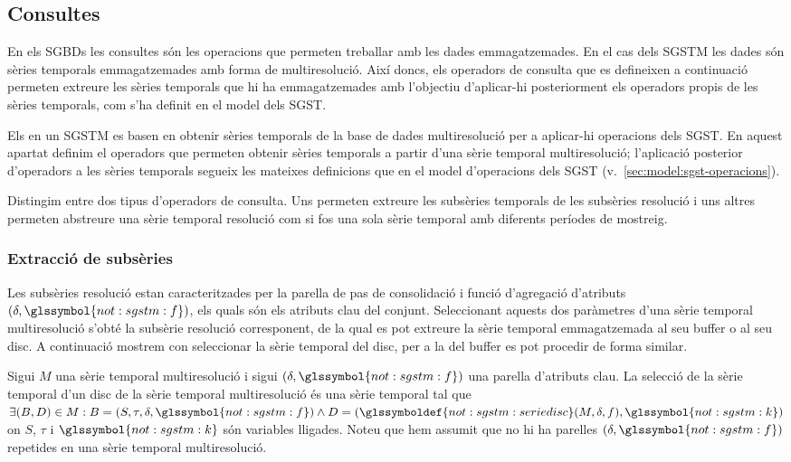 \subsection{Consultes}
\label{sec:sgstm:consultes}

En els \glspl{SGBD} les consultes són les
operacions que permeten treballar amb les dades emmagatzemades. En el
cas dels \gls{SGSTM} les dades són sèries temporals emmagatzemades amb forma
de multiresolució. Així doncs, els operadors de consulta que es
defineixen a continuació permeten extreure les sèries temporals que hi
ha emmagatzemades amb l'objectiu d’aplicar-hi posteriorment els
operadors propis de les sèries temporals, com s'ha definit en el model
dels \gls{SGST}.

Els  en un
\gls{SGSTM} es basen en obtenir sèries temporals de la base de dades
multiresolució per a aplicar-hi operacions dels \gls{SGST}.  En
aquest apartat definim el operadors que permeten obtenir sèries
temporals a partir d'una sèrie temporal multiresolució; l'aplicació
posterior d'operadors a les sèries temporals segueix les mateixes
definicions que en el model d'operacions dels \gls{SGST}
(v.~\autoref{sec:model:sgst-operacions}).

Distingim entre dos tipus d'operadors de consulta. Uns permeten
extreure les subsèries temporals de les subsèries resolució i uns altres
permeten abstreure una sèrie temporal resolució com si fos una sola
sèrie temporal amb diferents períodes de mostreig.


\subsubsection{Extracció de subsèries}


Les subsèries resolució estan caracteritzades per la parella de pas de
consolidació i funció d'agregació d'atributs
$(\delta,\glssymbol{not:sgstm:f})$, els quals són els atributs clau del
conjunt. Seleccionant aquests dos paràmetres d'una sèrie temporal
multiresolució s'obté la subsèrie resolució corresponent, de la qual
es pot extreure la sèrie temporal emmagatzemada al seu buffer o al seu
disc. A continuació mostrem con seleccionar la sèrie temporal del
disc, per a la del buffer es pot procedir de forma similar.

\begin{definition}
  Sigui $M$ una sèrie temporal multiresolució i sigui
  $(\delta,\glssymbol{not:sgstm:f})$ una parella d'atributs clau. La
  selecció de la sèrie temporal d'un disc de la sèrie temporal
  multiresolució és una sèrie temporal tal que $\exists(B,D)\in M:
  B=(S,\tau,\delta,\glssymbol{not:sgstm:f}) \wedge D=
  (\glssymboldef{not:sgstm:seriedisc}(M,\delta,f),\glssymbol{not:sgstm:k})$
  on $S$, $\tau$ i $\glssymbol{not:sgstm:k}$ són variables lligades. 
  Noteu que hem assumit que no hi ha parelles
  $(\delta,\glssymbol{not:sgstm:f})$ repetides en una sèrie temporal
  multiresolució.
\end{definition}




